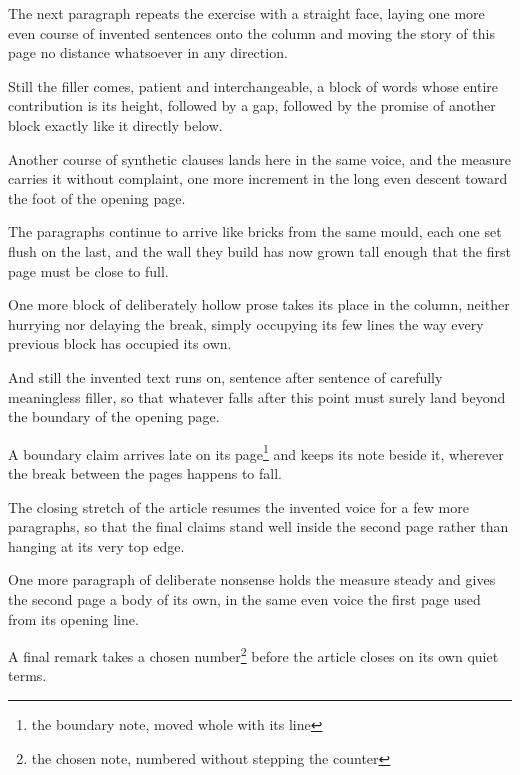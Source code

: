 \documentclass{article}
\begin{document}
The next paragraph repeats the exercise with a straight face, laying
one more even course of invented sentences onto the column and moving
the story of this page no distance whatsoever in any direction.

Still the filler comes, patient and interchangeable, a block of words
whose entire contribution is its height, followed by a gap, followed
by the promise of another block exactly like it directly below.

Another course of synthetic clauses lands here in the same voice, and
the measure carries it without complaint, one more increment in the
long even descent toward the foot of the opening page.

The paragraphs continue to arrive like bricks from the same mould,
each one set flush on the last, and the wall they build has now grown
tall enough that the first page must be close to full.

One more block of deliberately hollow prose takes its place in the
column, neither hurrying nor delaying the break, simply occupying its
few lines the way every previous block has occupied its own.

And still the invented text runs on, sentence after sentence of
carefully meaningless filler, so that whatever falls after this point
must surely land beyond the boundary of the opening page.

A boundary claim arrives late on its page\footnote{the boundary note,
moved whole with its line} and keeps its note beside it, wherever the
break between the pages happens to fall.

The closing stretch of the article resumes the invented voice for a
few more paragraphs, so that the final claims stand well inside the
second page rather than hanging at its very top edge.

One more paragraph of deliberate nonsense holds the measure steady and
gives the second page a body of its own, in the same even voice the
first page used from its opening line.

A final remark takes a chosen number\footnote[12]{the chosen note,
numbered without stepping the counter} before the article closes on
its own quiet terms.
\end{document}
